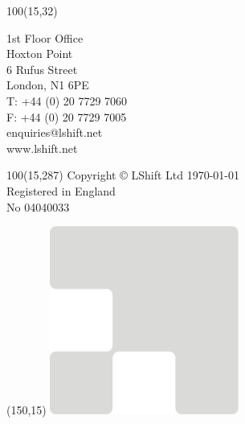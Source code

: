 \rfoot{\textcolor{LShiftBlue}{Technology from back to front}}
\textblockorigin{0mm}{0mm}
\setlength{\TPHorizModule}{1mm}
\setlength{\TPVertModule}{\TPHorizModule}


\begin{textblock}{100}(15,32)
  \begin{small}
    {\color{FrontPageGrey}
      \noindent1st Floor Office\\
      Hoxton Point\\
      6 Rufus Street\\
      London, N1 6PE\\

      \noindent T: +44 (0) 20 7729 7060\\
      F: +44 (0) 20 7729 7005\\
      enquiries@lshift.net\\
      www.lshift.net\\
    }
  \end{small}
\end{textblock}
\begin{textblock}{100}(15,287)
  \small \textcolor{FrontPageGrey}
  {Copyright © LShift Ltd \thisyear\today\\
    Registered in England\\
    No 04040033}
\end{textblock}



\begin{textblock}{1}(150,15)
  \includegraphics[width=6.2cm,height=6.2cm]{lshift-logo-grey-corner}
\end{textblock}


\rfoot{}

